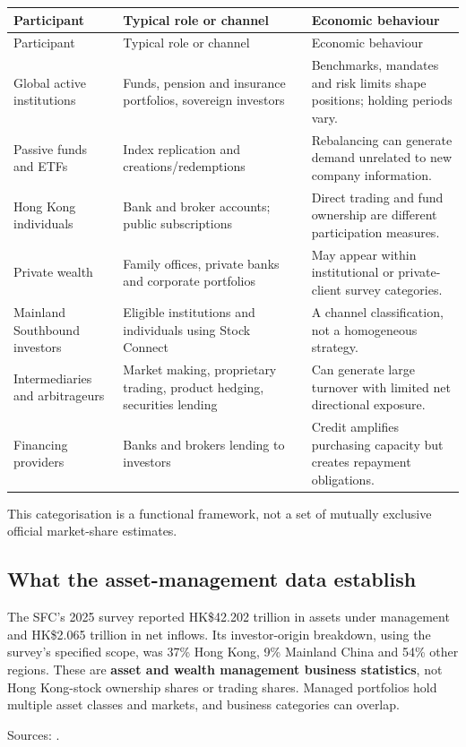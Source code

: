 \documentclass[11pt,a4paper]{article}
\newcommand{\source}[1]{\par{\footnotesize\color{ink}Sources: \cite{#1}.}\par}
\begin{document}
\begin{longtable}{@{}L{3.3cm}L{5.7cm}L{6.5cm}@{}}
\toprule Participant & Typical role or channel & Economic behaviour\\\midrule\endfirsthead
\toprule Participant & Typical role or channel & Economic behaviour\\\midrule\endhead
Global active institutions & Funds, pension and insurance portfolios, sovereign investors & Benchmarks, mandates and risk limits shape positions; holding periods vary.\\
Passive funds and ETFs & Index replication and creations/redemptions & Rebalancing can generate demand unrelated to new company information.\\
Hong Kong individuals & Bank and broker accounts; public subscriptions & Direct trading and fund ownership are different participation measures.\\
Private wealth & Family offices, private banks and corporate portfolios & May appear within institutional or private-client survey categories.\\
Mainland Southbound investors & Eligible institutions and individuals using Stock Connect & A channel classification, not a homogeneous strategy.\\
Intermediaries and arbitrageurs & Market making, proprietary trading, product hedging, securities lending & Can generate large turnover with limited net directional exposure.\\
Financing providers & Banks and brokers lending to investors & Credit amplifies purchasing capacity but creates repayment obligations.\\
\bottomrule
\end{longtable}
This categorisation is a functional framework, not a set of mutually exclusive official market-share estimates.

\subsection{What the asset-management data establish}
The SFC's 2025 survey reported HK\$42.202 trillion in assets under management and HK\$2.065 trillion in net inflows. Its investor-origin breakdown, using the survey's specified scope, was 37\% Hong Kong, 9\% Mainland China and 54\% other regions. These are \textbf{asset and wealth management business statistics}, not Hong Kong-stock ownership shares or trading shares. Managed portfolios hold multiple asset classes and markets, and business categories can overlap.\source{awm}
\end{document}
